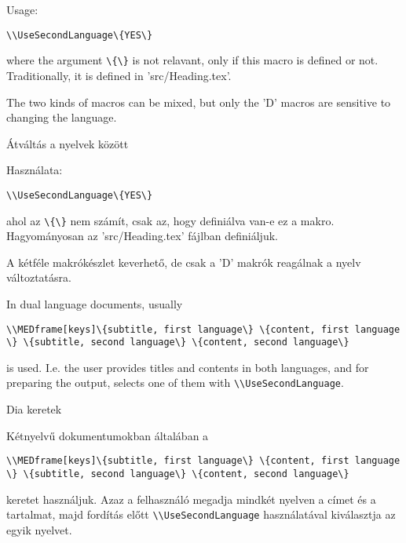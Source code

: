 {

Usage:

\noindent\lstinline|\\UseSecondLanguage\{YES\}|

\noindent where the argument \lstinline|\{\}| is not relavant, only if this macro is defined or not.
Traditionally, it is defined in 'src/Heading.tex'.

The two kinds of macros can be mixed, but only the 'D' macros 
are sensitive to changing the language.
}
{Átváltás a nyelvek között}
{

Használata:

\noindent\lstinline|\\UseSecondLanguage\{YES\}|

\noindent ahol az \lstinline|\{\}| nem számít, csak az, hogy definiálva van-e ez a makro.
Hagyományosan az 'src/Heading.tex' fájlban definiáljuk.

A kétféle makrókészlet keverhető, de csak a 'D' makrók reagálnak 
a nyelv változtatásra.
}


{
In dual language documents, usually 
\par\noindent\lstinline|\\MEDframe[keys]\{subtitle, first language\} \{content, first language \} \{subtitle, second language\} \{content, second language\}|
\par\noindent is used. I.e. the user provides titles and contents in both languages,
and for preparing the output, selects one of them with \lstinline|\\UseSecondLanguage|.
}
{Dia keretek}
{
Kétnyelvű dokumentumokban általában a
\par\noindent\lstinline|\\MEDframe[keys]\{subtitle, first language\} \{content, first language \} \{subtitle, second language\} \{content, second language\}|
\par\noindent  keretet használjuk. Azaz a felhasználó megadja mindkét nyelven
a címet és a tartalmat, majd fordítás előtt \lstinline|\\UseSecondLanguage|
használatával kiválasztja az egyik nyelvet.
}



